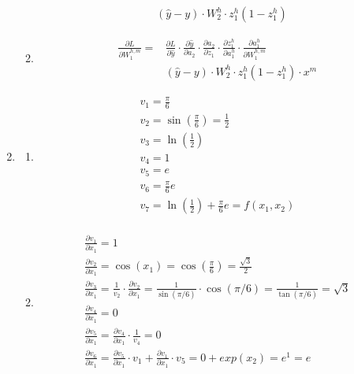 \documentclass[submit]{harvardml}
\begin{document}
\begin{enumerate}
\begin{enumerate}
\begin{align*}
            &\boxed{(\hat{y}-y)\cdot W_2^h \cdot z_1^h (1-z_1^h)}
        \end{align*}
        \item
        \begin{align*}
            \frac{\partial L}{\partial W_1^{h,m}} =& \frac{\partial L}{\partial \hat{y}} \cdot \frac{\partial \hat{y}}{\partial a_2} \cdot \frac{\partial a_2}{\partial z_1} \cdot
            \frac{\partial z_1^h}{\partial a_1^h} \cdot
            \frac{\partial a_1^h}{\partial W_1^{h,m}}\\
            &\boxed{(\hat{y}-y)\cdot W_2^h \cdot z_1^h (1-z_1^h)\cdot x^m}
        \end{align*}
    \end{enumerate}
    \item
    \begin{enumerate}
        \item 
        \begin{align*}
            v_1 = \frac{\pi}{6}\\
            v_2 = \sin(\frac{\pi}{6}) = \frac{1}{2}\\
            v_3 = \ln(\frac{1}{2})\\
            v_4 = 1\\
            v_5 = e\\
            v_6 = \frac{\pi}{6}e\\
            v_7 = \ln(\frac{1}{2}) + \frac{\pi}{6}e = f(x_1, x_2)\\
        \end{align*}
        \item
        \begin{align*}
            \frac{\partial v_1}{\partial x_1} = 1\\
            \frac{\partial v_2}{\partial x_1} = \cos(x_1) = \cos(\frac{\pi}{6}) = \frac{\sqrt{3}}{2}\\
            \frac{\partial v_3}{\partial x_1} = \frac{1}{v_2}\cdot\frac{\partial v_2}{\partial x_1} = \frac{1}{\sin(\pi/6)}\cdot \cos(\pi/6) = \frac{1}{\tan(\pi/6)} = \sqrt{3}\\
            \frac{\partial v_4}{\partial x_1} = 0\\
            \frac{\partial v_5}{\partial x_1} = \frac{\partial v_4}{\partial x_1}\cdot \frac{1}{v_4} = 0\\
            \frac{\partial v_6}{\partial x_1} = \frac{\partial v_5}{\partial x_1}\cdot v_1 + \frac{\partial v_1}{\partial x_1} \cdot v_5 = 0 + exp(x_2) = e^1 = e\\

\end{align*}
\end{enumerate}
\end{enumerate}
\end{document}

